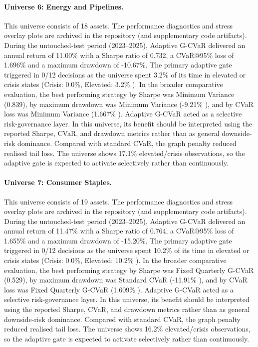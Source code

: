 \documentclass[11pt]{article}
\begin{document}
\paragraph{Universe 6: Energy and Pipelines.}
This universe consists of 18 assets. The performance diagnostics and stress overlay plots are archived in the repository (and supplementary code artifacts). During the untouched-test period (2023--2025), Adaptive G-CVaR delivered an annual return of 11.00\% with a Sharpe ratio of 0.732, a CVaR@95\% loss of 1.696\% and a maximum drawdown of -10.67\%. The primary adaptive gate triggered in 0/12 decisions as the universe spent 3.2\% of its time in elevated or crisis states (Crisis: 0.0\%, Elevated: 3.2\% ). In the broader comparative evaluation, the best performing strategy by Sharpe was Minimum Variance (0.839), by maximum drawdown was Minimum Variance (-9.21\% ), and by CVaR loss was Minimum Variance (1.667\% ). Adaptive G-CVaR acted as a selective risk-governance layer. In this universe, its benefit should be interpreted using the reported Sharpe, CVaR, and drawdown metrics rather than as general downside-risk dominance. Compared with standard CVaR, the graph penalty reduced realised tail loss. The universe shows 17.1\% elevated/crisis observations, so the adaptive gate is expected to activate selectively rather than continuously.

\paragraph{Universe 7: Consumer Staples.}
This universe consists of 19 assets. The performance diagnostics and stress overlay plots are archived in the repository (and supplementary code artifacts). During the untouched-test period (2023--2025), Adaptive G-CVaR delivered an annual return of 11.47\% with a Sharpe ratio of 0.764, a CVaR@95\% loss of 1.655\% and a maximum drawdown of -15.20\%. The primary adaptive gate triggered in 0/12 decisions as the universe spent 10.2\% of its time in elevated or crisis states (Crisis: 0.0\%, Elevated: 10.2\% ). In the broader comparative evaluation, the best performing strategy by Sharpe was Fixed Quarterly G-CVaR (0.529), by maximum drawdown was Standard CVaR (-11.91\% ), and by CVaR loss was Fixed Quarterly G-CVaR (1.609\% ). Adaptive G-CVaR acted as a selective risk-governance layer. In this universe, its benefit should be interpreted using the reported Sharpe, CVaR, and drawdown metrics rather than as general downside-risk dominance. Compared with standard CVaR, the graph penalty reduced realised tail loss. The universe shows 16.2\% elevated/crisis observations, so the adaptive gate is expected to activate selectively rather than continuously.
\end{document}
